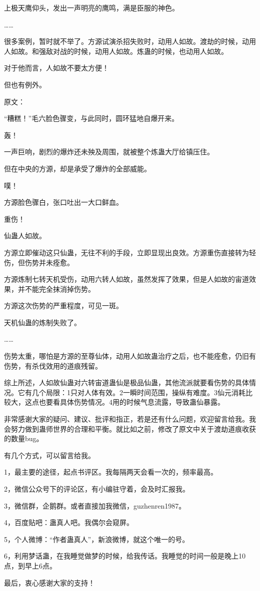 \begin{this_body}
上极天鹰仰头，发出一声明亮的鹰鸣，满是臣服的神色。

……

很多案例，暂时就不举了。方源试演杀招失败时，动用人如故。渡劫的时候，动用人如故。和强敌对战的时候，动用人如故。炼蛊的时候，也动用人如故。

对于他而言，人如故不要太方便！

但也有例外。

原文：

“糟糕！”毛六脸色骤变，与此同时，圆环猛地自爆开来。

轰！

一声巨响，剧烈的爆炸还未殃及周围，就被整个炼蛊大厅给镇压住。

但在中央的方源，却是承受了爆炸的全部威能。

噗！

方源脸色骤白，张口吐出一大口鲜血。

重伤！

仙蛊人如故。

方源立即催动这只仙蛊，无往不利的手段，立即显现出良效。方源重伤直接转为轻伤，但伤势并未痊愈。

方源炼制七转天机受伤，动用六转人如故，虽然发挥了效果，但是人如故的宙道效果，并不能完全抹消掉伤势。

方源这次伤势的严重程度，可见一斑。

天机仙蛊的炼制失败了。

……

伤势太重，哪怕是方源的至尊仙体，动用人如故蛊治疗之后，也不能痊愈，仍旧有伤势，有杀伐效用的道痕残留。

综上所述，人如故仙蛊对六转宙道蛊仙是极品仙蛊，其他流派就要看伤势的具体情况。它有几个局限：1只对人体有效。2一瞬时间范围，操纵有难度。3仙元消耗比较大，这点也要看具体伤势情况。4用的时候气息流露，导致蛊仙暴露。

非常感谢大家的疑问、建议、批评和指正，若是还有什么问题，欢迎留言给我。我会努力做到蛊师世界的合理和平衡。就比如之前，修改了原文中关于渡劫道痕收获的数量bug。

有几个方式，可以留言给我。

1，最主要的途径，起点书评区。我每隔两天会看一次的，频率最高。

2，微信公众号下的评论区，有小编驻守着，会及时汇报我。

3，微信群，企鹅群。或者直接加我微信，guzhenren1987。

4，百度贴吧：蛊真人吧。我偶尔会窥屏。

5，个人微博：“作者蛊真人”，新浪微博，就这个唯一的号。

6，利用梦话蛊，在我睡觉做梦的时候，给我传话。我睡觉的时间一般是晚上10点，到早上6点。

最后，衷心感谢大家的支持！

\end{this_body}

